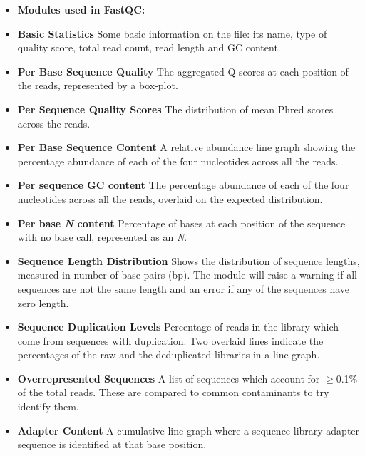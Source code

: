 \begin{itemize} \itemsep0em
\item[] \textbf{Modules used in FastQC:}
\item \textbf{Basic Statistics} \hspace{0.2cm} Some basic information on the file: its name, type of quality score, total read count, read length and GC content.
\item \textbf{Per Base Sequence Quality} \hspace{0.2cm} The aggregated Q-scores at each position of the reads, represented by a box-plot.
\item \textbf{Per Sequence Quality Scores} \hspace{0.2cm} The distribution of mean Phred scores across the reads.
\item \textbf{Per Base Sequence Content} \hspace{0.2cm} A relative abundance line graph showing the percentage abundance of each of the four nucleotides across all the reads. 
\item \textbf{Per sequence GC content} \hspace{0.2cm} The percentage abundance of each of the four nucleotides across all the reads, overlaid on the expected distribution. 
\item \textbf{Per base \textit{N} content} \hspace{0.2cm} Percentage of bases at each position of the sequence with no base call, represented as an \textit{N}.
\item \textbf{Sequence Length Distribution}\hspace{0.2cm} Shows the distribution of sequence lengths, measured in number of base-pairs (bp). The module will raise a warning if all sequences are not the same length and an error if any of the sequences have zero length.
\item \textbf{Sequence Duplication Levels} \hspace{0.2cm} Percentage of reads in the library which come from sequences with duplication. Two overlaid lines indicate the percentages of the raw and the deduplicated libraries in a line graph.
\item \textbf{Overrepresented Sequences} \hspace{0.2cm} A list of sequences which account for $\geq$0.1\% of the total reads. These are compared to common contaminants to try identify them.
\item \textbf{Adapter Content} \hspace{0.2cm} A cumulative line graph where a sequence library adapter sequence is identified at that base position.
\end{itemize}


